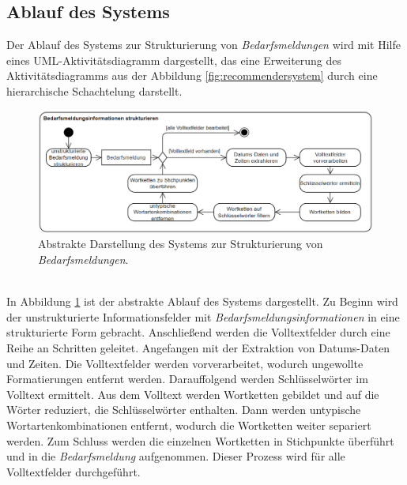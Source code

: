 \subsection{Ablauf des Systems}
Der Ablauf des Systems zur Strukturierung von \emph{Bedarfsmeldungen} wird mit Hilfe eines UML-Aktivitätsdiagramm dargestellt, das eine Erweiterung des Aktivitätsdiagramms aus der Abbildung \ref{fig:recommendersystem} durch eine hierarchische Schachtelung darstellt.
\begin{figure}[H]
	\centering  
	\includegraphics[width=\linewidth]{Abbildungen/bedarfsmeldungstrukturieren.png}
	\caption{Abstrakte Darstellung des Systems zur Strukturierung von \emph{Bedarfsmeldungen}.}
	\label{fig:ablaufsystemabstrakt}
\end{figure}\mbox{} \\
In Abbildung \ref{fig:ablaufsystemabstrakt} ist der abstrakte Ablauf des Systems dargestellt. Zu Beginn wird der unstrukturierte Informationsfelder mit \emph{Bedarfsmeldungsinformationen} in eine strukturierte Form gebracht. Anschließend werden die Volltextfelder durch eine Reihe an Schritten geleitet. Angefangen mit der Extraktion von Datums-Daten und Zeiten. Die Volltextfelder werden vorverarbeitet, wodurch ungewollte Formatierungen entfernt werden. Darauffolgend werden Schlüsselwörter im Volltext ermittelt. Aus dem Volltext werden Wortketten gebildet und auf die Wörter reduziert, die Schlüsselwörter enthalten. Dann werden untypische Wortartenkombinationen entfernt, wodurch die Wortketten weiter separiert werden. Zum Schluss werden die einzelnen Wortketten in Stichpunkte überführt und in die \emph{Bedarfsmeldung} aufgenommen. Dieser Prozess wird für alle Volltextfelder durchgeführt.